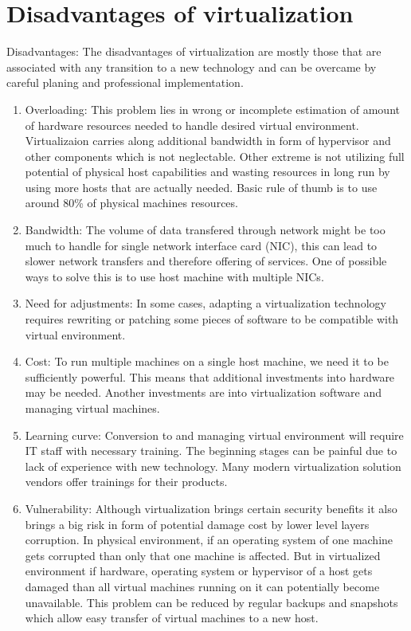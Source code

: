 \section{Disadvantages of virtualization}
Disadvantages: 
The disadvantages of virtualization are mostly those that are associated with any transition to a new technology and can be overcame by careful planing and professional implementation.
\begin{enumerate}
\item Overloading: This problem lies in wrong or incomplete estimation of amount of hardware resources needed to handle desired virtual environment. Virtualizaion carries along additional bandwidth in form of hypervisor and other components which is not neglectable. Other extreme is not utilizing full potential of physical host capabilities and wasting resources in long run by using more hosts that are actually needed. Basic rule of thumb is to use around 80\% of physical machines resources.
\item Bandwidth: The volume of data transfered through network might be too much to handle for single network interface card (NIC), this can lead to slower network transfers and therefore offering of services. One of possible ways to solve this is to use host machine with multiple NICs.
\item Need for adjustments: In some cases, adapting a virtualization technology requires rewriting or patching some pieces of software to be compatible with virtual environment.
\item Cost: To run multiple machines on a single host machine, we need it to be sufficiently powerful. This means that additional investments into hardware may be needed. Another investments are into virtualization software and managing virtual machines.
\item Learning curve: Conversion to and managing virtual environment will require IT staff with necessary training. The beginning stages can be painful due to lack of experience with new technology. Many modern virtualization solution vendors offer trainings for their products.
\item Vulnerability: Although virtualization brings certain security benefits it also brings a big risk in form of potential damage cost by lower level layers corruption. In physical environment, if an operating system of one machine gets corrupted than only that one machine is affected. But in virtualized environment if hardware, operating system or hypervisor of a host gets damaged than all virtual machines running on it can potentially become unavailable. This problem can be reduced by regular backups and snapshots which allow easy transfer of virtual machines to a new host.

\end{enumerate}
